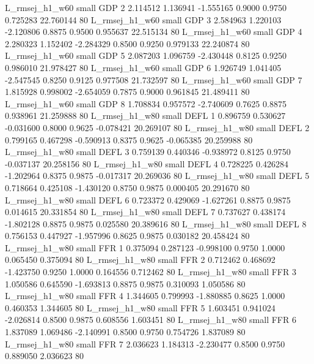 L_rmsej_h1_w60      small      GDP                 2 2.114512 1.136941 -1.555165 0.9000 0.9750  0.725283   22.760144 80
L_rmsej_h1_w60      small      GDP                 3 2.584963 1.220103 -2.120806 0.8875 0.9500  0.955637   22.515134 80
L_rmsej_h1_w60      small      GDP                 4 2.280323 1.152402 -2.284329 0.8500 0.9250  0.979133   22.240874 80
L_rmsej_h1_w60      small      GDP                 5 2.087203 1.096759 -2.430448 0.8125 0.9250  0.986010   21.978427 80
L_rmsej_h1_w60      small      GDP                 6 1.926749 1.041405 -2.547545 0.8250 0.9125  0.977508   21.732597 80
L_rmsej_h1_w60      small      GDP                 7 1.815928 0.998002 -2.654059 0.7875 0.9000  0.961845   21.489411 80
L_rmsej_h1_w60      small      GDP                 8 1.708834 0.957572 -2.740609 0.7625 0.8875  0.938961   21.259888 80
L_rmsej_h1_w80      small     DEFL                 1 0.896759 0.530627 -0.031600 0.8000 0.9625 -0.078421   20.269107 80
L_rmsej_h1_w80      small     DEFL                 2 0.799165 0.467298 -0.590913 0.8375 0.9625 -0.065385   20.259988 80
L_rmsej_h1_w80      small     DEFL                 3 0.759139 0.440346 -0.938972 0.8125 0.9750 -0.037137   20.258156 80
L_rmsej_h1_w80      small     DEFL                 4 0.728225 0.426284 -1.202964 0.8375 0.9875 -0.017317   20.269036 80
L_rmsej_h1_w80      small     DEFL                 5 0.718664 0.425108 -1.430120 0.8750 0.9875  0.000405   20.291670 80
L_rmsej_h1_w80      small     DEFL                 6 0.723372 0.429069 -1.627261 0.8875 0.9875  0.014615   20.331854 80
L_rmsej_h1_w80      small     DEFL                 7 0.737627 0.438174 -1.802128 0.8875 0.9875  0.025580   20.389616 80
L_rmsej_h1_w80      small     DEFL                 8 0.756153 0.447927 -1.957996 0.8625 0.9875  0.030182   20.458424 80
L_rmsej_h1_w80      small      FFR                 1 0.375094 0.287123 -0.998100 0.9750 1.0000  0.065450    0.375094 80
L_rmsej_h1_w80      small      FFR                 2 0.712462 0.468692 -1.423750 0.9250 1.0000  0.164556    0.712462 80
L_rmsej_h1_w80      small      FFR                 3 1.050586 0.645590 -1.693813 0.8875 0.9875  0.310093    1.050586 80
L_rmsej_h1_w80      small      FFR                 4 1.344605 0.799993 -1.880885 0.8625 1.0000  0.460353    1.344605 80
L_rmsej_h1_w80      small      FFR                 5 1.603451 0.941024 -2.026814 0.8500 0.9875  0.608556    1.603451 80
L_rmsej_h1_w80      small      FFR                 6 1.837089 1.069486 -2.140991 0.8500 0.9750  0.754726    1.837089 80
L_rmsej_h1_w80      small      FFR                 7 2.036623 1.184313 -2.230477 0.8500 0.9750  0.889050    2.036623 80
